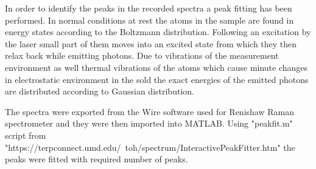 
In order to identify the peaks in the recorded spectra a peak fitting has been performed. In normal conditions at rest the atoms in the sample are found in energy states according to the Boltzmann distribution. Following an excitation by the laser small part of them moves into an excited state from which they then relax back while emitting photons. Due to vibrations of the measurement environment as well thermal vibrations of the atoms which cause minute changes in electrostatic environment in the sold the exact energies of the emitted photons are distributed according to Gaussian distribution.

The spectra were exported from the Wire software used for Renishaw Raman spectrometer and they were then imported into MATLAB. Using "peakfit.m" script from "https://terpconnect.umd.edu/~toh/spectrum/InteractivePeakFitter.htm" the peaks were fitted with required number of peaks.
